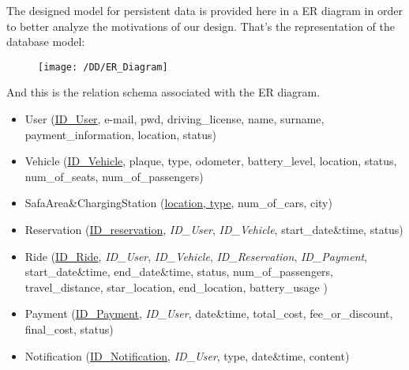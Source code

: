 The designed model for persistent data is provided here in a ER diagram in order to better analyze the motivations of our design. That's the representation of the database model:
\begin{figure}[!h]
  \centering
  \vspace{0.2cm}
  \texttt{[image: /DD/ER\_Diagram]}\\%
  \vspace{0.4cm}
  \label{fig:ER_Diagram} 
\end{figure}

 And this is the relation schema associated with the ER diagram.
\begin{itemize} %
	\item{User (\underline{ID\_User}, e-mail, pwd, driving\_license, name, surname, payment\_information, location, status)} %
	\item{Vehicle (\underline{ID\_Vehicle}, plaque, type, odometer, battery\_level, location, status, num\_of\_seats, num\_of\_passengers) }
	\item{SafaArea\&ChargingStation (\underline{location, type}, num\_of\_cars, city)} %
	\item{Reservation (\underline{ID\_reservation}, \textit{ID\_User}, \textit{ID\_Vehicle}, start\_date\&time, status)}
	\item{Ride (\underline{ID\_Ride}, \textit{ID\_User}, \textit{ID\_Vehicle}, \textit{ID\_Reservation}, \textit{ID\_Payment}, start\_date\&time, end\_date\&time, status, num\_of\_passengers, travel\_distance, star\_location, end\_location, battery\_usage )}
	\item{Payment (\underline{ID\_Payment}, \textit{ID\_User}, date\&time, total\_cost, fee\_or\_discount, final\_cost, status)}
	\item{Notification (\underline{ID\_Notification}, \textit{ID\_User}, type, date\&time, content)}
\end{itemize}


